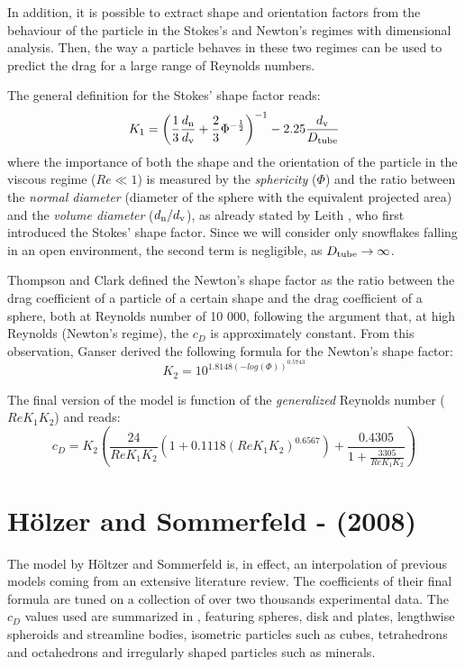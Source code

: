 		In addition, it is possible to extract shape and orientation factors	from the behaviour of the particle in the Stokes’s and Newton’s regimes with dimensional analysis. Then, the way a particle behaves in these two regimes can be used to predict the drag for a large range of Reynolds numbers.
		
		The general definition for the Stokes' shape factor reads:
		\begin{equation}
			K_1 = \left( \frac{1}{3} \frac{d_{\textup{n}}}{d_{\textup{v}}} + \frac{2}{3} \Phi^{-\frac{1}{2}} \right)^{-1} -2.25 \frac{d_{\textup{v}}}{D_{\textup{tube}}} 
		\end{equation}
		where the importance of both the shape and the orientation of the particle in the viscous regime ($ Re \ll 1 $) is measured by the \textit{sphericity} ($ \Phi $) and the ratio between the \textit{normal diameter} (diameter of the sphere with the equivalent projected area) and the \textit{volume diameter} ($ d_{\textup{n}} / d_{\textup{v}} $), as already stated by Leith \cite{Leith-1987}, who first introduced the Stokes' shape factor.
		Since we will consider only snowflakes falling in an open environment, the second term is negligible, as $ D_{\textup{tube}} \rightarrow \infty $.
		
		Thompson and Clark \cite{ThompsonClark-1991} defined the Newton's shape factor as the ratio between the drag coefficient of a particle of a certain shape and the drag coefficient of a sphere, both at Reynolds number of 10 000, following the argument that, at high Reynolds (Newton's regime), the $ c_D $ is approximately constant.
		From this observation, Ganser derived the following formula for the Newton's shape factor:
		\begin{equation}
			K_2 = 10^{1.8148 (-log(\Phi))^{0.5743}}
		\end{equation}
		
		The final version of the model is function of the \textit{generalized} Reynolds number ($ Re K_1 K_2 $) and reads:
		\begin{equation}
			c_D = K_2 \left( \frac{24}{Re K_1 K_2} (1 + 0.1118 (Re K_1 K_2)^{0.6567}) + \frac{0.4305}{1 + \frac{3305}{Re K_1 K_2}}\right) 
		\end{equation}
	
				
	\section{H\"{o}lzer and Sommerfeld - (2008)}
		The model by H\"{o}ltzer and Sommerfeld \cite{HoltzerSommerfeld-2008} is, in effect, an interpolation of previous models coming from an extensive literature review. The coefficients of their final formula are tuned on a collection of over two thousands experimental data. The $ c_D $ values used are summarized in , featuring spheres, disk and plates, lengthwise spheroids and streamline bodies, isometric particles such as cubes, tetrahedrons and octahedrons and irregularly shaped particles such as minerals.
		
